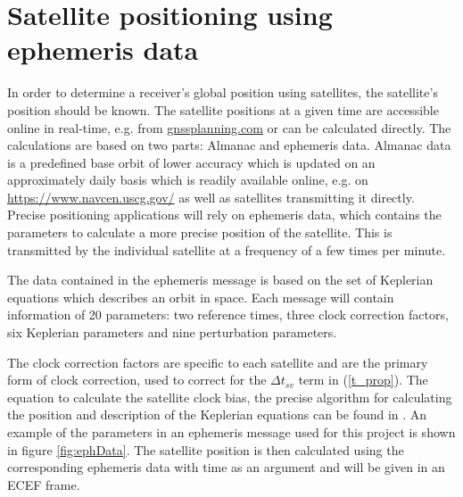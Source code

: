 \section{Satellite positioning using ephemeris data}\label{chap:ephPositioning}
In order to determine a receiver's global position using satellites, the satellite's position should be known. The satellite positions at a given time are accessible online in real-time, e.g. from \url{gnssplanning.com} 
or can be calculated directly. The calculations are based on two parts: Almanac and ephemeris data. Almanac data is a predefined base orbit of lower accuracy which is updated on an approximately daily basis which is readily available online, e.g. on \url{https://www.navcen.uscg.gov/}
as well as satellites transmitting it directly. Precise positioning applications will rely on ephemeris data, which contains the parameters to calculate a more precise position of the satellite. This is transmitted by the individual satellite at a frequency of a few times per minute.
\par
The  data contained in the ephemeris message is based on the set of Keplerian equations which describes an orbit in space. 
Each message will contain information of 20 parameters: two reference times, three clock correction factors, six Keplerian parameters and nine perturbation parameters. 
\par
The clock correction factors are specific to each satellite and are the primary form of clock correction, used to correct for the $\Delta t_{sv}$ term in (\ref{t_prop}). The equation to calculate the satellite clock bias, the precise algorithm for calculating the position and description of the Keplerian equations can be found in \cite{dunn2012global}. An example of the parameters in an ephemeris message used for this project is shown in figure \ref{fig:ephData}. The satellite position is then calculated using the corresponding ephemeris data with time as an argument and will be given in an ECEF frame.
